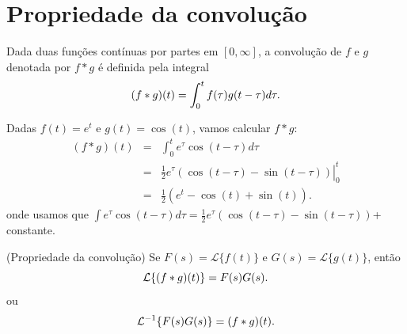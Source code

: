 \documentclass[a4paper,10pt]{book}
\begin{document}
 
\section{Propriedade da convolução}
Dada duas funções contínuas por partes em $[0,\infty]$, a convolução  de $f$ e $g$ denotada por $f*g$ é definida pela integral
\begin{equation}{\label{def_conv}}
 (f*g)(t)=\int_0^t f(\tau)g(t-\tau)d\tau.
\end{equation}

{\label{ex_conv_1}}Dadas $f(t)=e^t$ e $g(t)=\cos(t)$, vamos calcular $f*g$:
\begin{eqnarray*}
 (f*g)(t)&=&\int_0^t e^{\tau} \cos(t-\tau)d\tau\\
 &=&\left. \frac{1}{2}e^\tau\left(\cos(t-\tau)-\sin(t-\tau)  \right)\right|_0^t\\
 &=& \frac{1}{2}\left(e^t-\cos(t)+\sin(t)  \right).
\end{eqnarray*}
onde usamos que $\int  e^{\tau} \cos(t-\tau)d\tau=\frac{1}{2}e^\tau \left(\cos(t-\tau)-\sin(t-\tau)  \right)$+ constante.


{\label{prop_conv}}(Propriedade da convolução) Se $F(s)=\mathcal{L}\{f(t)\}$ e $G(s)=\mathcal{L}\{g(t)\}$, então
\begin{equation}{\label{eq_prop_conv}}
 \mathcal{L}\{(f*g)(t)\}=F(s)G(s).
\end{equation}
ou
\begin{equation}{\label{eq_inv_prop_conv}}
 \mathcal{L}^{-1}\{F(s)G(s)\}=(f*g)(t).
\end{equation}
\end{document}
